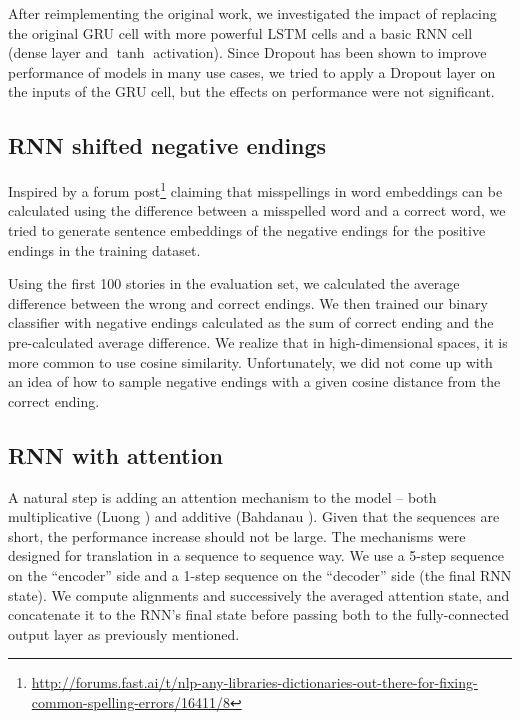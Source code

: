 \documentclass{article}
\begin{document}
After reimplementing the original work, we investigated the impact of replacing the original GRU cell with more powerful LSTM cells and a basic RNN cell (dense layer and $\tanh$ activation). Since Dropout \citep{Srivastava2014} has been shown to improve performance of models in many use cases, we tried to apply a Dropout layer on the inputs of the GRU cell, but the effects on performance were not significant.

\subsection{RNN shifted negative endings}
Inspired by a forum post\footnote{\url{http://forums.fast.ai/t/nlp-any-libraries-dictionaries-out-there-for-fixing-common-spelling-errors/16411/8}} claiming that misspellings in word embeddings can be calculated using the difference between a misspelled word and a correct word, we tried to generate sentence embeddings of the negative endings for the positive endings in the training dataset.

Using the first 100 stories in the evaluation set, we calculated the average difference between the wrong and correct endings. We then trained our binary classifier with negative endings calculated as the sum of correct ending and the pre-calculated average difference.
We realize that in high-dimensional spaces, it is more common to use cosine similarity. Unfortunately, we did not come up with an idea of how to sample negative endings with a given cosine distance from the correct ending.

\subsection{RNN with attention}
A natural step is adding an attention mechanism to the model -- both multiplicative (Luong \citep{Luong2015EffectiveTranslation}) and additive (Bahdanau \citep{Bahdanau2016End-to-EndRecognition}). Given that the sequences are short, the performance increase should not be large.
The mechanisms were designed for translation in a sequence to sequence way. We use a 5-step sequence on the ``encoder'' side and a 1-step sequence on the ``decoder'' side (the final RNN state). We compute alignments and successively the averaged attention state, and concatenate it to the RNN's final state before passing both to the fully-connected output layer as previously mentioned.
\end{document}
